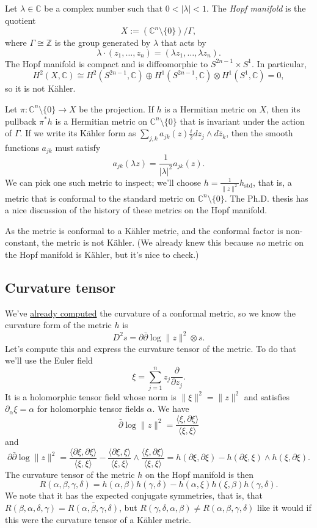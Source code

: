 \documentclass[11pt]{article}
\theoremstyle{definition}
\newcommand{\kk}[1]{\mathbb{#1}}
\begin{document}
Let \(\lambda \in \kk C\) be a complex number such that \(0 < |\lambda| < 1\). The \emph{Hopf manifold} is the quotient
$$
X := (\kk C^n \setminus \{0\}) / \Gamma,
$$
where \(\Gamma \cong \kk Z\) is the group generated by \(\lambda\) that acts by
$$
\lambda \cdot (z_1, \ldots, z_n) = (\lambda z_1, \ldots, \lambda z_n).
$$
The Hopf manifold is compact and is diffeomorphic to \(S^{2n-1} \times S^1\). In particular,
$$
H^2(X, \kk C) \cong H^2(S^{2n-1}, \kk C) \oplus H^1(S^{2n-1}, \kk C) \otimes H^1(S^1, \kk C) = 0,
$$
so it is not K\"ahler.

Let \(\pi : \kk C^n \setminus \{0\} \to X\) be the projection. If \(h\) is a Hermitian metric on \(X\), then its pullback \(\pi^*h\) is a Hermitian metric on \(\kk C^n \setminus \{0\}\) that is invariant under the action of \(\Gamma\). If we write its K\"ahler form as \(\sum_{j,k} a_{jk}(z) \tfrac{i}{2} dz_j \wedge d\bar z_k\), then the smooth functions \(a_{jk}\) must satisfy
$$
a_{jk}(\lambda z) = \frac{1}{|\lambda|^2} a_{jk}(z).
$$
We can pick one such metric to inspect; we'll choose \(h = \frac{1}{\|z\|^2} h_{\mathrm{std}}\), that is, a metric that is conformal to the standard metric on \(\kk C^n \setminus \{0\}\). The Ph.D. thesis \cite{istrati:tel-02156198} has a nice discussion of the history of these metrics on the Hopf manifold.

As the metric is conformal to a K\"ahler metric, and the conformal factor is non-constant, the metric is not K\"ahler. (We already knew this because \emph{no} metric on the Hopf manifold is K\"ahler, but it's nice to check.)


\subsection{Curvature tensor}
\label{sec:org96d544d}

We've \hyperref[sec:org65fcbad]{already computed} the curvature of a conformal metric, so we know the curvature form of the metric $h$ is
$$
D^2 s = \partial\bar\partial \log \|z\|^2 \otimes s.
$$
Let's compute this and express the curvature tensor of the metric. To do that we'll use the Euler field
$$
\xi = \sum_{j=1}^n z_j \frac{\partial}{\partial z_j}.
$$
It is a holomorphic tensor field whose norm is $\|\xi\|^2 = \|z\|^2$ and satisfies $\partial_\alpha \xi = \alpha$ for holomorphic tensor fields $\alpha$. We have
$$
\bar\partial \log \|z\|^2
= \frac{\langle \xi, \partial\xi \rangle}{\langle \xi,\xi \rangle}
$$
and
$$
\partial\bar\partial \log \|z\|^2
= \frac{\langle \partial \xi, \partial \xi \rangle}{\langle \xi, \xi \rangle}
- \frac{\langle \partial\xi, \xi\rangle}{\langle \xi, \xi \rangle} \wedge \frac{\langle \xi, \partial \xi \rangle}{\langle \xi, \xi \rangle}
= h(\partial\xi, \partial\xi) - h(\partial\xi, \xi) \wedge h(\xi, \partial\xi).
$$
The curvature tensor of the metric \(h\) on the Hopf manifold is then
$$
R(\alpha,\beta,\gamma,\delta)
= h(\alpha, \beta) h(\gamma, \delta)
- h(\alpha, \xi) h(\xi, \beta) h(\gamma, \delta).
$$
We note that it has the expected conjugate symmetries, that is, that \(R(\beta, \alpha, \delta, \gamma) = \overline{R(\alpha, \beta, \gamma, \delta)}\), but \(R(\gamma, \delta, \alpha, \beta) \not= R(\alpha, \beta, \gamma, \delta)\) like it would if this were the curvature tensor of a K\"ahler metric.
\end{document}
